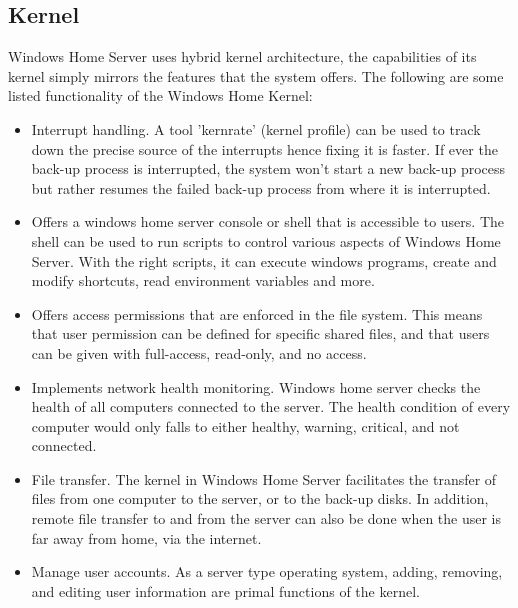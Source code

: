 \documentclass[a4paper, 12pt]{article}
\begin{document}
\subsection{Kernel}
Windows Home Server uses hybrid kernel architecture, the  capabilities of its kernel simply mirrors the features that the system offers. The following are some listed functionality of the Windows Home Kernel:                    
\begin{itemize}
    \item Interrupt handling. A tool 'kernrate' (kernel profile) can be used to track down the precise source of the interrupts hence fixing it is faster. If ever the back-up process is interrupted, the system won't start a new back-up process but rather resumes the failed back-up process from where it is interrupted. 
    \item Offers a windows home server console or shell that is  accessible to users. The shell can be used to run scripts to control various aspects of Windows Home Server. With the right scripts, it can execute windows programs, create and modify shortcuts, read environment variables and more. 
    \item Offers access permissions that are enforced in the file system. This means that user permission can be defined for specific shared files, and that users can be given with full-access, read-only, and no access. 
    \item Implements network health monitoring. Windows home server checks the health of all computers connected to the server. The health condition of every computer would only falls to either healthy, warning, critical, and not connected. 
    \item File transfer. The kernel in Windows Home Server facilitates the transfer of files from one computer to the server, or to the back-up disks. In addition, remote file transfer to and from the server can also be done when the user is far away from home, via the internet.
    \item Manage user accounts. As a server type operating system, adding, removing, and editing user information are primal functions of the kernel.
\end{itemize}
\end{document}
